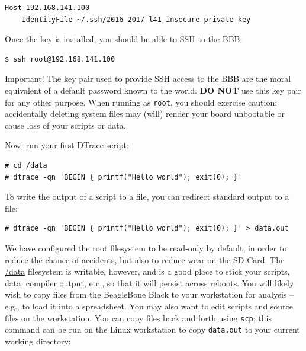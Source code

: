 \documentclass[a4paper,10pt]{article}
\newcommand{\code}[1]{\texttt{\small #1}}
\begin{document}
\begin{small}
\begin{verbatim}
Host 192.168.141.100
    IdentityFile ~/.ssh/2016-2017-l41-insecure-private-key
\end{verbatim}
\end{small}

Once the key is installed, you should be able to SSH to the BBB:

\begin{small}
\begin{verbatim}
$ ssh root@192.168.141.100
\end{verbatim}
\end{small}
\begin{bclogo}[logo=\bcattention, noborder=true, barre=none]{Important!}
    The key pair used to provide SSH access to the BBB are the moral
    equivalent of a default password known to the world.  \textbf{DO NOT} use this
    key pair for any other purpose.
    When running as \code{root}, you should exercise caution: accidentally
    deleting system files may (will) render your board unbootable or cause loss of
    your scripts or data.
\end{bclogo}

Now, run your first DTrace script:

\begin{small}
\begin{verbatim}
# cd /data
# dtrace -qn 'BEGIN { printf("Hello world"); exit(0); }'
\end{verbatim}
\end{small}

To write the output of a script to a file, you can redirect standard output to
a file:

\begin{small}
\begin{verbatim}
# dtrace -qn 'BEGIN { printf("Hello world"); exit(0); }' > data.out
\end{verbatim}
\end{small}

We have configured the root filesystem to be read-only by default, in order to
reduce the chance of accidents, but also to reduce wear on the SD Card.
The \url{/data} filesystem is writable, however, and is a good place to stick
your scripts, data, compiler output, etc., so that it will persist across
reboots.
You will likely wish to copy files from the BeagleBone Black to your
workstation for analysis -- e.g., to load it into a spreadsheet.
You may also want to edit scripts and source files on the workstation.
You can copy files back and forth using \code{scp}; this command can be run on
the Linux workstation to copy \code{data.out} to your current working
directory:
\end{document}
